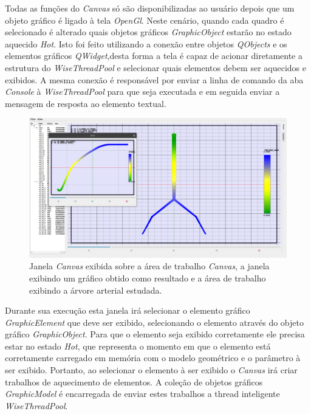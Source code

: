 \documentclass[a4paper,12pt]{monografia}
\theoremstyle{plain}
\theoremstyle{definition}
\theoremstyle{remark}
\begin{document}
Todas as funções do \textit{Canvas} só são disponibilizadas ao usuário depois que um objeto gráfico é ligado à tela \textit{OpenGl}. Neste cenário, quando cada quadro é selecionado é alterado quais objetos gráficos \textit{GraphicObject} estarão no estado aquecido \textit{Hot}. Isto foi feito utilizando a conexão entre objetos \textit{QObjects} e os elementos gráficos \textit{QWidget},desta forma a tela é capaz de acionar diretamente a estrutura do \textit{WiseThreadPool} e selecionar quais elementos debem ser aquecidos e exibidos. A mesma conexão é responsável por enviar a linha de comando da aba \textit{Console} à \textit{WiseThreadPool} para que seja executada e em seguida enviar a mensagem de resposta ao elemento textual.

\begin{figure}[!htbp]
	\centering
	\includegraphics[width=\linewidth]{Figures/IGU_025.png}
	\caption{Janela \textit{Canvas} exibida sobre a área de trabalho \textit{Canvas}, a janela exibindo um gráfico obtido como resultado e a área de trabalho exibindo a árvore arterial estudada.}
	\label{fig:canvas}
\end{figure}

Durante sua execução esta janela irá selecionar o elemento gráfico \textit{GraphicElement} que deve ser exibido, selecionando o elemento através do objeto gráfico \textit{GraphicObject}. Para que o elemento seja exibido corretamente ele precisa estar no estado \textit{Hot}, que representa o momento em que o elemento está corretamente carregado em memória com o modelo geométrico e o parâmetro à ser exibido. Portanto, ao selecionar o elemento à ser exibido o \textit{Canvas} irá criar trabalhos de aquecimento de elementos. A coleção de objetos gráficos \textit{GraphicModel} é encarregada de enviar estes trabalhos a thread inteligente \textit{WiseThreadPool}.
\end{document}
